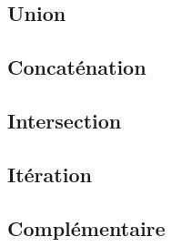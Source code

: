 \subsection{Union}

\subsection{Concaténation}

\subsection{Intersection}

\subsection{Itération}

\subsection{Complémentaire}



